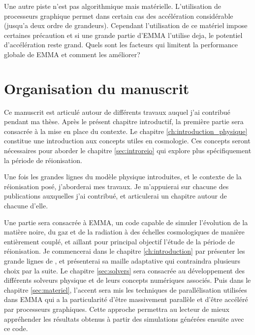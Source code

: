 Une autre piste n'est pas algorithmique mais matérielle.
L'utilisation de processeurs graphique permet dans certain cas des accélération considérable (jusqu'a deux ordre de grandeurs).
Cependant l'utilisation de ce matériel impose certaines précaution et si une grande partie d'EMMA l'utilise deja, le potentiel d'accélération reste grand.
Quels sont les facteurs qui limitent la performance globale de EMMA et comment les améliorer?





\section{Organisation du manuscrit}

Ce manuscrit est articulé autour de différents travaux auquel j'ai contribué pendant ma thèse.
Après le présent chapitre introductif, la première partie sera consacrée à la mise en place du contexte.
Le chapitre \ref{ch:introduction_physique} constitue une introduction aux concepts utiles en cosmologie.
Ces concepts seront nécessaires pour aborder le chapitre \ref{sec:introreio} qui explore plus spécifiquement la période de réionisation.

Une fois les grandes lignes du modèle physique introduites, et le contexte de la réionisation posé, j'aborderai mes travaux.
Je m'appuierai sur chacune des publications auxquelles j'ai contribué, et articulerai un chapitre autour de chacune d'elle. 

Une partie sera consacrée à EMMA, un code capable de simuler l'évolution de la matière noire, du gaz et de la radiation à des échelles cosmologiques de manière entièrement couplé, et aillant pour principal objectif l'étude de la période de réionisation.
Je commencerai dans le chapitre \ref{ch:introduction} par présenter les grande lignes de \emma, et présenterai sa maille adaptative qui contraindra plusieurs choix par la suite.
Le chapitre \ref{sec:solvers} sera consacrée au développement des différents solveurs physique et de leurs concepts numériques associés.
Puis dans le chapitre \ref{sec:materiel}, l'accent sera mis les techniques de parallélisation utilisées dans EMMA qui a la particularité d'être massivement parallèle et d'être accéléré par processeurs graphiques.
Cette approche permettra au lecteur de mieux appréhender les résultats obtenus à partir des simulations générées ensuite avec ce code.

